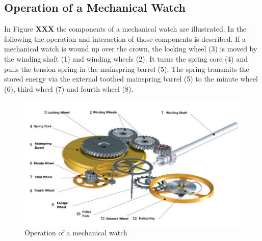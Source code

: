 \documentclass[12pt, a4paper]{report}
\begin{document}
    \subsection{Operation of a Mechanical Watch}  
    In Figure \textbf{XXX} the components of a mechanical watch are illustrated. In the following the operation and interaction of those components is described.
    If a mechanical watch is wound up over the crown, the locking wheel (3) is moved by the winding shaft (1) and winding wheels (2). It turns the spring core (4) and pulls the tension spring in the mainspring barrel (5). The spring transmits the stored energy via the external toothed mainspring barrel (5) to the minute wheel (6), third wheel (7) and fourth wheel (8). 
    \newline
    \noindent
    \begin{figure}[H]
    \centering
    \includegraphics[scale=0.45]{Images/Funktionsweise-Uhrwerk.jpg}
    
    \caption{Operation of a mechanical watch \cite{Uhrwerk}}
    \end{figure}
    
\end{document}
